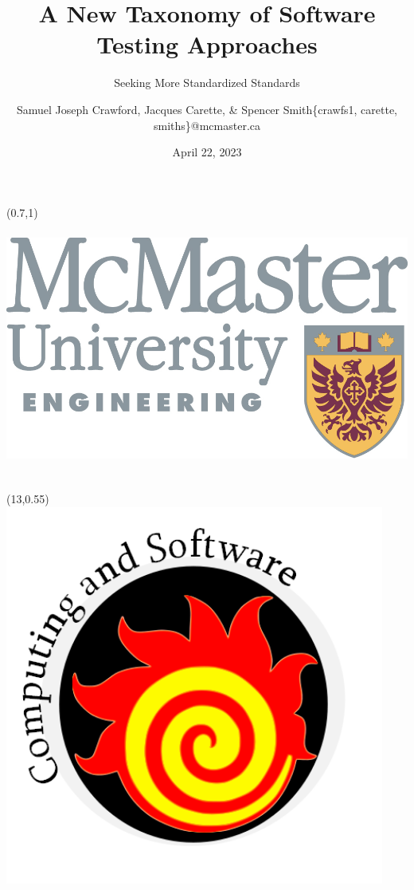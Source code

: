 \documentclass[22pt]{beamer}
\title{A New Taxonomy of Software Testing Approaches}
\subtitle{Seeking More Standardized Standards}
\author[Crawford, Carette, \& Smith]{Samuel Joseph Crawford, Jacques Carette, \& Spencer Smith\newline \small \{crawfs1, carette, smiths\}@mcmaster.ca}
\institute[McMaster University]{Department of Computing and Software, McMaster University} %
\date{April 22, 2023}
\begin{document}

\begin{frame}[fragile]

    \begin{textblock}{2}(0.7,1)
        \includegraphics[height=8.5cm]{eng_logo.png}
    \end{textblock}

    \begin{textblock}{2}(13,0.55)
        \includegraphics[height=12.5cm]{cas_logo.png}
    \end{textblock}


\end{frame}
\end{document}

